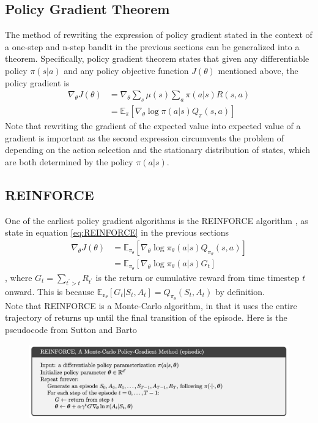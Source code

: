 \documentclass[12pt]{report}
\begin{document}
\subsection{Policy Gradient Theorem}

The method of rewriting the expression of policy gradient stated in the context of a one-step and n-step bandit in the previous sections can be generalized into a theorem. Specifically, policy gradient theorem states that \cite{sutton2018reinforcement} given any differentiable policy $\pi(s|a)$ and any policy objective function $J(\theta)$ mentioned above, the policy gradient is
\begin{align}
    \nabla_\theta J(\theta) &= \nabla_\theta \sum_s \mu(s) \sum_a \pi(a|s) R(s,a) \nonumber\\
    &= \mathbb{E}_{\pi}[\nabla_\theta \log \pi(a|s) Q_{\pi}(s,a)] \label{eq:policy-grad}
\end{align}
Note that rewriting the gradient of the expected value into expected value of a gradient is important as the second expression circumvents the problem of depending on the action selection and the stationary distribution of states, which are both determined by the policy $\pi(a|s)$. 

\subsection{REINFORCE}

One of the earliest policy gradient algorithms is the REINFORCE algorithm \cite{williams1992simple}, as state in equation \ref{eq:REINFORCE} in the previous sections
\begin{align}
    \nabla_\theta J(\theta) &= \mathbb{E}_{\pi_\theta}[\nabla_\theta \log \pi_\theta(a|s) Q_{\pi_\theta}(s,a)] \nonumber\\
    &= \mathbb{E}_{\pi_\theta}[\nabla_\theta \log \pi_\theta(a|s) G_t]
\end{align}
, where $G_t = \sum_{t^\prime > t} R_{t^\prime}$ is the return or cumulative reward from time timestep $t$ onward. This is because $\mathbb{E_{\pi_\theta}}[G_t|S_t,A_t] = Q_{\pi_\theta}(S_t,A_t)$ by definition.\\

Note that REINFORCE is a Monte-Carlo algorithm, in that it uses the entire trajectory of returns up until the final transition of the episode. Here is the pseudocode from Sutton and Barto \cite{sutton2018reinforcement}
\begin{figure}[H]
    \center
    \includegraphics[width=0.9\linewidth]{figs/REINFORCE.png}
    \label{fig:REINFORCE}
\end{figure}
\end{document}
